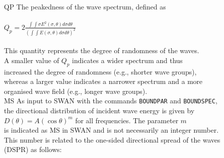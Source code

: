 \documentclass[12pt]{book}
\begin{document}
\begin{tabbing}
                        \-\\
QP                   \> The peakedness of the wave spectrum, defined as\+\\
                        \\
$Q_p = 2 \frac{\int \int \sigma E^2(\sigma, \theta) d\sigma d\theta}{(\int \int E(\sigma, \theta) d\sigma d\theta)^2}$ \\
                        \\
                        This quantity represents the degree of randomness of the waves.\\
                        A smaller value of $Q_p$ indicates a wider spectrum and thus\\
                        increased the degree of randomness (e.g., shorter wave groups),\\
                        whereas a larger value indicates a narrower spectrum and a more\\
                        organised wave field (e.g., longer wave groups).\-\\
MS                   \> As input to SWAN with the commands {\tt BOUNDPAR} and {\tt BOUNDSPEC},\+\\
                        the directional distribution
                        of incident wave energy is given by\\
                        $D(\theta) = A(\cos\theta)^m$
                        for all frequencies. The parameter $m$\\
                        is indicated as MS in SWAN and is not necessarily an integer number.\\
                        This number is related to the
                        one-sided directional spread of the waves\\
                        (DSPR) as follows:\-\\
\end{tabbing}
\newpage
\end{document}
